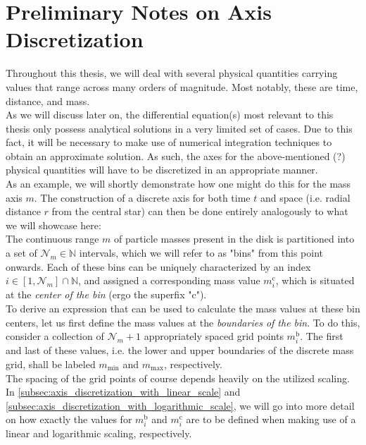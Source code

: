 \newpage
\section{Preliminary Notes on Axis Discretization}

    Throughout this thesis, we will deal with several physical quantities carrying values that 
    range across many orders of magnitude. Most notably, these are time, distance, and mass. \\

    As we will discuss later on, the differential equation(s) most relevant to this thesis only 
    possess analytical solutions in a very limited set of cases. Due to this fact, it will be
    necessary to make use of numerical integration techniques to obtain an approximate solution.
    As such, the axes for the above-mentioned (?) physical quantities will have to be discretized 
    in an appropriate manner. \\

    As an example, we will shortly demonstrate how one might do this for the mass axis $m$. The
    construction of a discrete axis for both time $t$ and space (i.e. radial distance $r$ from the
    central star) can then be done entirely analogously to what we will showcase here: \\

    The continuous range $m$ of particle masses present in the disk is partitioned into a set of 
    $\mathcal N_m\in\mathbb N$ intervals, which we will refer to as "bins" from this point onwards. 
    Each of these bins can be uniquely characterized by an index 
    $i\in[1,\mathcal N_m]\cap\mathbb N$, and assigned a corresponding mass value $m_i^\text{c}$, 
    which is situated at the \textit{center of the bin} (ergo the superfix "c").\\
    
    To derive an expression that can be used to calculate the mass values at these bin centers, 
    let us first define the mass values at the \textit{boundaries of the bin}. To do this,
    consider a collection of $\mathcal N_m+1$ appropriately spaced grid points $m_i^\text{b}$. 
    The first and last of these values, i.e. the lower and upper boundaries of the discrete mass 
    grid, shall be labeled $m_\text{min}$ and $m_\text{max}$, respectively. \\

    The spacing of the grid points of course depends heavily on the utilized scaling. In
    \cref{subsec:axis_discretization_with_linear_scale} and
    \cref{subsec:axis_discretization_with_logarithmic_scale}, we will go into more detail on how 
    exactly the values for $m_i^\text{b}$ and $m_i^\text{c}$ are to be defined when making use of 
    a linear and logarithmic scaling, respectively. \\

